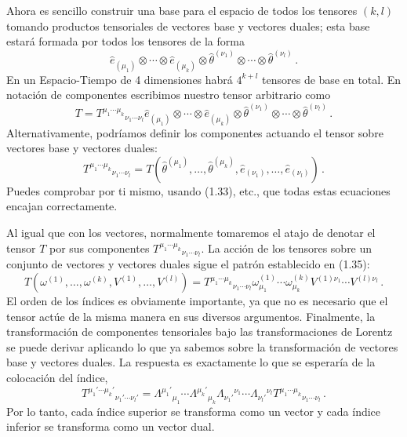 \documentclass[11pt,b5paper,openany,twoside]{book}
\newcommand{\e}[1]{\hat{e}_{(#1)}}
\newcommand{\ztheta}[1]{{\hat{\theta}}^{(#1)}}
\begin{document}
Ahora es sencillo construir una base para el espacio de todos los tensores $(k,l)$ tomando productos tensoriales de vectores base y vectores duales; esta base estará formada por todos los tensores de la forma
\begin{equation}
\e{\mu_1}\otimes\cdots\otimes\e{\mu_k}\otimes
 \ztheta{\nu_1}\otimes\cdots\otimes \ztheta{\nu_l}\,.\label{1.47}
\end{equation}
En un Espacio-Tiempo de 4 dimensiones habrá $4^{k+l}$ tensores de base en total.
En notación de componentes escribimos nuestro tensor arbitrario como
\begin{equation}
T = T^{\mu_1 \cdots \mu_k}{}_{\nu_1\cdots\nu_l}
\e{\mu_1}\otimes\cdots\otimes\e{\mu_k}\otimes
 \ztheta{\nu_1}\otimes\cdots\otimes \ztheta{\nu_l}\,.\label{1.48}
\end{equation}
Alternativamente, podríamos definir los componentes actuando el tensor sobre vectores base y vectores duales:
\begin{equation}
T^{\mu_1 \cdots \mu_k}{}_{\nu_1\cdots\nu_l} =
T( \ztheta{\mu_1},\ldots,  \ztheta{\mu_k},\e{\nu_1},\ldots,\e{\nu_l})
\,.\label{1.49}
\end{equation}
Puedes comprobar por ti mismo, usando (1.33), etc., que todas estas ecuaciones encajan correctamente.

Al igual que con los vectores, normalmente tomaremos el atajo de denotar el tensor $T$ por sus componentes $T^{\mu_1 \cdots \mu_k}{}_{\nu_1\cdots\nu_l}$.
La acción de los tensores sobre un conjunto de vectores y vectores duales sigue el patrón establecido en (1.35):
\begin{equation}
T(\omega^{(1)},\ldots ,\omega^{(k)},V^{(1)},\ldots ,V^{(l)}) =
T^{\mu_1 \cdots \mu_k}{}_{\nu_1\cdots\nu_l}
\omega^{(1)}_{\mu_1}\cdots\omega^{(k)}_{\mu_k}V^{(1)\nu_1}\cdots
V^{(l)\nu_l}\,.\label{1.50}
\end{equation}
El orden de los índices es obviamente importante, ya que no es necesario que el tensor actúe de la misma manera en sus diversos argumentos.
Finalmente, la transformación de componentes tensoriales bajo las transformaciones de Lorentz se puede derivar aplicando lo que ya sabemos sobre la transformación de vectores base y vectores duales.
La respuesta es exactamente lo que se esperaría de la colocación del índice,
\begin{equation}
T^{\mu_1' \cdots \mu_k'}{}_{\nu_1'\cdots\nu_l'} =
\Lambda^{\mu_1'}{}_{\mu_1}\cdots\Lambda^{\mu_k'}{}_{\mu_k}
\Lambda_{\nu_1'}{}^{\nu_1}\cdots\Lambda_{\nu_l'}{}^{\nu_l}
T^{\mu_1 \cdots \mu_k}{}_{\nu_1\cdots\nu_l} \,.\label{1.51}
\end{equation}
Por lo tanto, cada índice superior se transforma como un vector y cada índice inferior se transforma como un vector dual.
\end{document}
